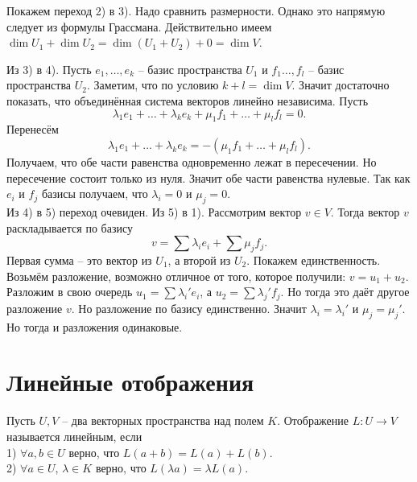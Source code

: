 Покажем переход 2) в 3). Надо сравнить размерности. Однако это напрямую следует из формулы Грассмана. Действительно имеем $\dim U_1 + \dim U_2=\dim (U_1+U_2) + 0 = \dim V$.


Из 3) в 4). Пусть $e_1,\dots,e_k$ -- базис пространства $U_1$ и $f_1\dots,f_l$ -- базис пространства $U_2$. Заметим, что по условию $k+l=\dim V$. Значит достаточно показать, что объединённая система векторов  линейно независима. Пусть 
$$\lambda_1 e_1+\dots+\lambda_ke_k+\mu_1f_1+\dots+\mu_lf_l=0.$$
Перенесём 
$$\lambda_1 e_1+\dots+\lambda_ke_k=-(\mu_1f_1+\dots+\mu_lf_l).$$
Получаем, что обе части равенства одновременно лежат в пересечении. Но пересечение состоит только из нуля. Значит обе части равенства нулевые. Так как $e_i$ и $f_j$ базисы получаем, что $\lambda_i=0$ и $\mu_j=0$.\\


Из 4) в 5) переход очевиден. Из 5) в 1). Рассмотрим вектор $v\in V$. Тогда вектор $v$ раскладывается по базису
$$v=\sum \lambda_i e_i + \sum \mu_j f_j.$$
Первая сумма -- это вектор из $U_1$, а второй из $U_2$. Покажем единственность. Возьмём разложение, возможно отличное от того, которое получили: $v=u_1+u_2$. Разложим в свою очередь $u_1=\sum \lambda_i'e_i$, а $u_2=\sum \lambda_j' f_j$. Но тогда это даёт другое разложение $v$. Но разложение по базису единственно. Значит $\lambda_i=\lambda_i'$ и $\mu_j=\mu_j'$. Но тогда и разложения одинаковые.

\endproof



\section{Линейные отображения}

 Пусть $U,V$ -- два векторных пространства над полем $K$. Отображение $L\colon U \to V$ называется линейным, если\\
1) $\forall a,b \in U$ верно, что $L(a+b)=L(a)+L(b)$.\\
2) $\forall a \in U$, $\lambda \in K$ верно, что $L(\lambda a)=\lambda L(a)$.
\edfn



